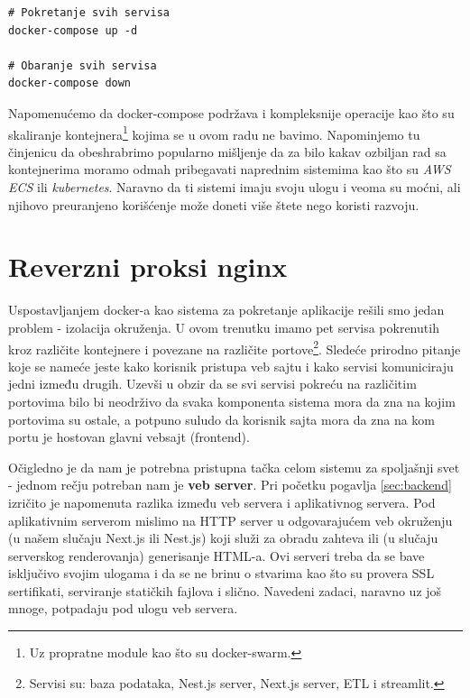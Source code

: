 \documentclass[12pt,oneside]{memoir}
\begin{document}
\newpage
\begin{lstlisting}[caption={docker-compose komande.}, label={lst:dockerlocalcommands}]
# Pokretanje svih servisa
docker-compose up -d 

# Obaranje svih servisa
docker-compose down
\end{lstlisting}

Napomenućemo da docker-compose podržava i kompleksnije operacije kao što su skaliranje kontejnera\footnote{Uz propratne module kao što su docker-swarm.} kojima se u ovom radu ne bavimo. Napominjemo tu činjenicu da obeshrabrimo popularno mišljenje da za bilo kakav ozbiljan rad sa kontejnerima moramo odmah pribegavati naprednim sistemima kao što su \textit{AWS ECS} ili \textit{kubernetes}. Naravno da ti sistemi imaju svoju ulogu i veoma su moćni, ali njihovo preuranjeno korišćenje može doneti više štete nego koristi razvoju.


\section{Reverzni proksi nginx}

Uspostavljanjem docker-a kao sistema za pokretanje aplikacije rešili smo jedan problem - izolacija okruženja. U ovom trenutku imamo pet servisa pokrenutih kroz različite kontejnere i povezane na različite portove\footnote{Servisi su: baza podataka, Nest.js server, Next.js server, ETL i streamlit.}. Sledeće prirodno pitanje koje se nameće jeste kako korisnik pristupa veb sajtu i kako servisi komuniciraju jedni između drugih. Uzevši u obzir da se svi servisi pokreću na različitim portovima bilo bi neodrživo da svaka komponenta sistema mora da zna na kojim portovima su ostale, a potpuno suludo da korisnik sajta mora da zna na kom portu je hostovan glavni vebsajt (frontend).

Očigledno je da nam je potrebna pristupna tačka celom sistemu za spoljašnji svet - jednom rečju potreban nam je \textbf{veb server}. Pri početku pogavlja \ref{sec:backend} izričito je napomenuta razlika između veb servera i aplikativnog servera. Pod aplikativnim serverom mislimo na HTTP server u odgovarajućem veb okruženju (u našem slučaju Next.js ili Nest.js) koji služi za obradu zahteva ili (u slučaju serverskog renderovanja) generisanje HTML-a. Ovi serveri treba da se bave isključivo svojim ulogama i da se ne brinu o stvarima kao što su provera SSL sertifikati, serviranje statičkih fajlova i slično. Navedeni zadaci, naravno uz još mnoge, potpadaju pod ulogu veb servera.
\end{document}
